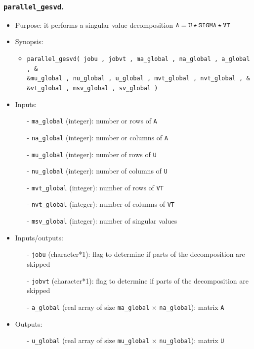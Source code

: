 \documentclass[12pt]{article}
\begin{document}
\subsubsection{{\tt parallel\_gesvd}.} 
\begin{itemize}
\item Purpose: it performs a singular value decomposition ${\tt A = U \star SIGMA \star VT}$
\item Synopsis: 
\begin{itemize}
\item {\tt parallel\_gesvd( jobu , jobvt , ma\_global , na\_global , a\_global , \& \\ \&mu\_global , nu\_global , u\_global , mvt\_global , nvt\_global , \& \\ \&vt\_global , msv\_global , sv\_global )}
\end{itemize}
\item Inputs: 
\begin{itemize}
\item[-] {\tt ma\_global} (integer): number or rows of {\tt A}
\item[-] {\tt na\_global} (integer): number or columns of {\tt A}
\item[-] {\tt mu\_global} (integer): number of rows of {\tt U}
\item[-] {\tt nu\_global} (integer): number of columns of {\tt U}
\item[-] {\tt mvt\_global} (integer): number of rows of {\tt VT}
\item[-] {\tt nvt\_global} (integer): number of columns of {\tt VT}
\item[-] {\tt msv\_global} (integer): number of singular values
\end{itemize}
\item Inputs/outputs: 
\begin{itemize}
\item[-] {\tt jobu} (character*1): flag to determine if parts of the decomposition are skipped
\item[-] {\tt jobvt} (character*1): flag to determine if parts of the decomposition are skipped
\item[-] {\tt a\_global} (real array of size {\tt ma\_global} $\times$ {\tt na\_global}): matrix {\tt A}
\end{itemize}
\item Outputs: 
\begin{itemize}
\item[-] {\tt u\_global} (real array of size {\tt mu\_global} $\times$ {\tt nu\_global}): matrix {\tt U}

\end{itemize}
\end{itemize}
\end{document}
